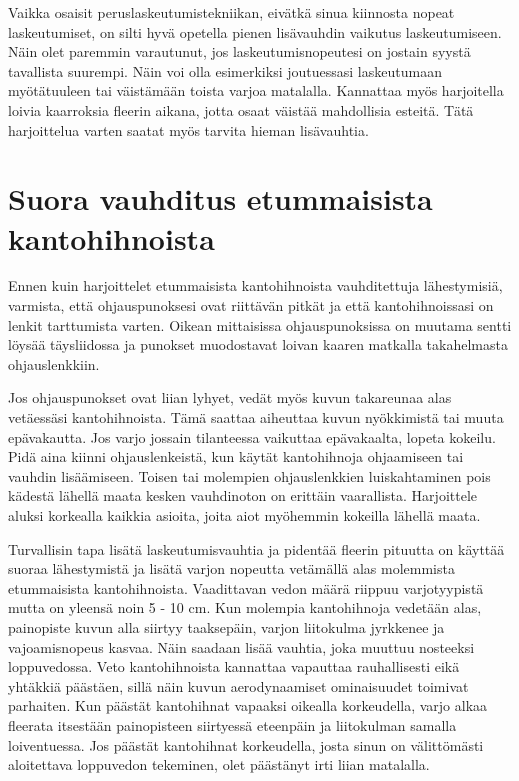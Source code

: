 Vaikka osaisit peruslaskeutumistekniikan, eivätkä sinua kiinnosta nopeat laskeutumiset, on silti hyvä opetella pienen lisävauhdin vaikutus laskeutumiseen. Näin olet paremmin varautunut, jos laskeutumisnopeutesi on jostain syystä tavallista suurempi. Näin voi olla esimerkiksi joutuessasi laskeutumaan myötätuuleen tai väistämään toista varjoa matalalla. Kannattaa myös harjoitella loivia kaarroksia fleerin aikana, jotta osaat väistää mahdollisia esteitä. Tätä harjoittelua varten saatat myös tarvita hieman lisävauhtia. 

\section{ Suora vauhditus etummaisista kantohihnoista }
\label{laskeutumistekniikat-suora-vauhditus-etummaisista-kantohihnoista}


Ennen kuin harjoittelet etummaisista kantohihnoista vauhditettuja lähestymisiä, varmista, että ohjauspunoksesi ovat riittävän pitkät ja että kantohihnoissasi on lenkit tarttumista varten. Oikean mittaisissa ohjauspunoksissa on muutama sentti löysää täysliidossa ja punokset muodostavat loivan kaaren matkalla takahelmasta ohjauslenkkiin.  


Jos ohjauspunokset ovat liian lyhyet, vedät myös kuvun takareunaa alas vetäessäsi kantohihnoista. Tämä saattaa aiheuttaa kuvun nyökkimistä tai muuta epävakautta. Jos varjo jossain tilanteessa vaikuttaa epävakaalta, lopeta kokeilu. Pidä aina kiinni ohjauslenkeistä, kun käytät kantohihnoja ohjaamiseen tai vauhdin lisäämiseen. Toisen tai molempien ohjauslenkkien luiskahtaminen pois kädestä lähellä maata kesken vauhdinoton on erittäin vaarallista. Harjoittele aluksi korkealla kaikkia asioita, joita aiot myöhemmin kokeilla lähellä maata. 


Turvallisin tapa lisätä laskeutumisvauhtia ja pidentää fleerin pituutta on käyttää suoraa lähestymistä ja lisätä varjon nopeutta vetämällä alas molemmista etummaisista kantohihnoista. Vaadittavan vedon määrä riippuu varjotyypistä mutta on yleensä noin 5 - 10 cm. Kun molempia kantohihnoja vedetään alas, painopiste kuvun alla siirtyy taaksepäin, varjon liitokulma jyrkkenee ja vajoamisnopeus kasvaa. Näin saadaan lisää vauhtia, joka muuttuu nosteeksi loppuvedossa. Veto kantohihnoista kannattaa vapauttaa rauhallisesti eikä yhtäkkiä päästäen, sillä näin kuvun aerodynaamiset ominaisuudet toimivat parhaiten. Kun päästät kantohihnat vapaaksi oikealla korkeudella, varjo alkaa fleerata itsestään painopisteen siirtyessä eteenpäin ja liitokulman samalla loiventuessa. Jos päästät kantohihnat korkeudella, josta sinun on välittömästi aloitettava loppuvedon tekeminen, olet päästänyt irti liian matalalla. 

